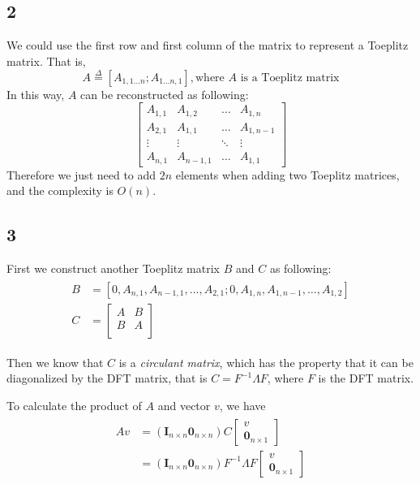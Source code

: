 \documentclass[paper=a4, fontsize=11pt]{scrartcl} %
\numberwithin{equation}{section} %
\numberwithin{figure}{section} %
\numberwithin{table}{section} %
\numberwithin{claimcounter}{section}
\begin{document}
\subsection*{2}
We could use the first row and first column of the matrix to represent a
Toeplitz matrix. That is,
\begin{equation}
  A \overset{\Delta}{=} [A_{1, 1...n}; A_{1...n, 1}], \text{where $A$ is a
  Toeplitz matrix}
\end{equation}
In this way, $A$ can be reconstructed as following:
\[
\begin{bmatrix}
  A_{1,1} & A_{1, 2} & \dots & A_{1, n} \\
  A_{2,1} & A_{1, 1} & \dots & A_{1, n-1} \\
  \vdots & \vdots  & \ddots & \vdots \\
  A_{n,1} & A_{n-1, 1} & \dots & A_{1,1}
\end{bmatrix}
\]
Therefore we just need to add $2n$ elements when adding two Toeplitz
matrices, and the complexity is $O(n)$.

\subsection*{3}
First we construct another Toeplitz matrix $B$ and $C$ as following:
\begin{align}
  \begin{split}
    B &= [0, A_{n, 1}, A_{n-1, 1}, \dots, A_{2, 1}; 0, A_{1, n}, A_{1, n-1},
    \dots, A_{1, 2}] \\
    C &= \begin{bmatrix}
      A & B \\
      B & A \\
    \end{bmatrix}
  \end{split}
\end{align}

Then we know that $C$ is a \textit{circulant matrix}, which has the property
that it can be diagonalized by the DFT matrix, that is $C = F^{-1}\Lambda F$,
where $F$ is the DFT matrix.

To calculate the product of $A$ and vector $v$, we have 
\begin{align}
  \begin{split}
    Av & = (\mathbf{I}_{n\times n} \mathbf{0}_{n\times n}) C \begin{bmatrix}
      v \\
      \mathbf{0}_{n \times 1}
    \end{bmatrix} \\
    &= (\mathbf{I}_{n\times n} \mathbf{0}_{n\times n}) F^{-1}\Lambda F\begin{bmatrix}
      v \\
      \mathbf{0}_{n \times 1}
    \end{bmatrix} 
  \end{split}
  \label{equ:5-3}
\end{align}
\end{document}
